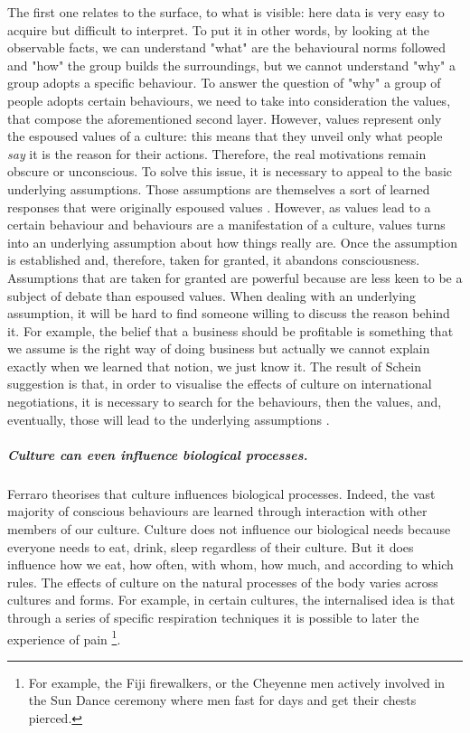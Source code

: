 \documentclass[../main.tex]{subfiles}
\begin{document}
The first one relates to the surface, to what is visible: here data is very easy to acquire but difficult to interpret. To put it in other words, by looking at the observable facts, we can understand "what" are the behavioural norms followed and "how" the group builds the surroundings, but we cannot understand "why" a group adopts a specific behaviour. To answer the question of "why" a group of people adopts certain behaviours, we need to take into consideration the values, that compose the aforementioned second layer. However, values represent only the espoused values of a culture: this means that they unveil only what people \textit{say} it is the reason for their actions. Therefore, the real motivations remain obscure or unconscious. To solve this issue, it is necessary to appeal to the basic underlying assumptions. Those assumptions are themselves a sort of learned responses that were originally espoused values \autocite[3]{schein}. However, as values lead to a certain behaviour and behaviours are a manifestation of a culture, values turns into an underlying assumption about how things really are. Once the assumption is established and, therefore, taken for granted, it abandons consciousness. Assumptions that are taken for granted are powerful because are less keen to be a subject of debate than espoused values. When dealing with an underlying assumption, it will be hard to find someone willing to discuss the reason behind it. For example, the belief that a business should be profitable is something that we assume is the right way of doing business but actually we cannot explain exactly when we learned that notion, we just know it. The result of Schein suggestion is that, in order to visualise the effects of culture on international negotiations, it is necessary to search for the behaviours, then the values, and, eventually, those will lead to the underlying assumptions \mancite\autocite[4]{schein}.%

\subparagraph*{Culture can even influence biological processes.} Ferraro theorises that culture influences biological processes. Indeed, the vast majority of conscious behaviours are learned through interaction with other members of our culture. Culture does not influence our biological needs because everyone needs to eat, drink, sleep regardless of their culture. But it does influence how we eat, how often, with whom, how much, and according to which rules. The effects of culture on the natural processes of the body varies across cultures and forms. For example, in certain cultures, the internalised idea is that through a series of specific respiration techniques it is possible to later the experience of pain \footnote{For example, the Fiji firewalkers, or the Cheyenne men actively involved in the Sun Dance ceremony where men fast for days and get their chests pierced.}.
\end{document}

